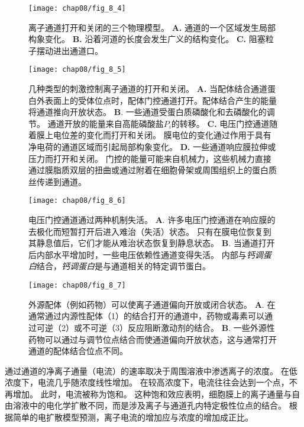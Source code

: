 \begin{figure}[htbp]
	\centering
	\texttt{[image: chap08/fig\_8\_4]}
	\caption{离子通道打开和关闭的三个物理模型。
		\textbf{A.} 通道的一个区域发生局部构象变化。
		\textbf{B.} 沿着河道的长度会发生广义的结构变化。
		\textbf{C.} 阻塞粒子摆动进出通道口。}
	\label{fig:8_4}
\end{figure}


\begin{figure}[htbp]
	\centering
	\texttt{[image: chap08/fig\_8\_5]}
	\caption{几种类型的刺激控制离子通道的打开和关闭。
		\textbf{A.} 当配体结合通道蛋白外表面上的受体位点时，配体门控通道打开。配体结合产生的能量将通道推向开放状态。
		\textbf{B}. 一些通道受蛋白质磷酸化和去磷酸化的调节。
		通道开放的能量来自高能磷酸盐$P_i$的转移。
		\textbf{C.} 电压门控通道随着膜上电位差的变化而打开和关闭。
		膜电位的变化通过作用于具有净电荷的通道区域而引起局部构象变化。
		\textbf{D.} 一些通道响应膜拉伸或压力而打开和关闭。
		门控的能量可能来自机械力，这些机械力直接通过膜脂质双层的扭曲或通过附着在细胞骨架或周围组织上的蛋白质丝传递到通道。}
	\label{fig:8_5}
\end{figure}


\begin{figure}[htbp]
	\centering
	\texttt{[image: chap08/fig\_8\_6]}
	\caption{电压门控通道通过两种机制失活。
		\textbf{A}. 许多电压门控通道在响应膜的去极化而短暂打开后进入难治（失活）状态。
		只有在膜电位恢复到其静息值后，它们才能从难治状态恢复到静息状态。
		\textbf{B}. 当通道打开后内部水平增加时，一些电压依赖性通道变得失活。
		内部与\textit{钙调蛋白}结合，\textit{钙调蛋白}是与通道相关的特定调节蛋白。}
	\label{fig:8_6}
\end{figure}


\begin{figure}[htbp]
	\centering
	\texttt{[image: chap08/fig\_8\_7]}
	\caption{外源配体（例如药物）可以使离子通道偏向开放或闭合状态。
		\textbf{A}. 在通常通过内源性配体（1）的结合打开的通道中，药物或毒素可以通过可逆（2）或不可逆（3）反应阻断激动剂的结合。
		\textbf{B}. 一些外源性药物可以通过与调节位点结合而使通道偏向开放状态，这与通常打开通道的配体结合位点不同。}
	\label{fig:8_7}
\end{figure}


通过通道的净离子通量（电流）的速率取决于周围溶液中渗透离子的浓度。
在低浓度下，电流几乎随浓度线性增加。
在较高浓度下，电流往往会达到一个点，不再增加。
此时，电流被称为饱和。
这种饱和效应表明，细胞膜上的离子通量与自由溶液中的电化学扩散不同，而是涉及离子与通道孔内特定极性位点的结合。
根据简单的电扩散模型预测，离子电流的增加应与浓度的增加成正比。


